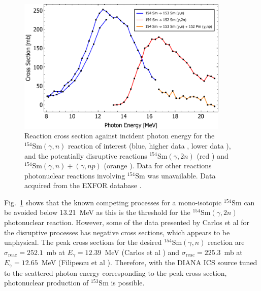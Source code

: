 \documentclass[../main.tex]{subfiles}
\begin{document}
\begin{figure}[!h]
\centering
\includegraphics[width=0.9\textwidth]{Figures/DIANA_Inverse_Compton_Source_Design/Sm154Landscape.pdf}
\caption{Reaction cross section against incident photon energy for the $^{154}\mathrm{Sm} \left(\gamma,n\right)$ reaction of interest (blue, higher data \cite{carlos1974giant}, lower data \cite{filipescu2014photoneutron}), and the potentially disruptive reactions $^{154}\mathrm{Sm} \left(\gamma,2n\right)$ (red \cite{carlos1974giant}) and $^{154}\mathrm{Sm} \left(\gamma,n\right) + \left(\gamma,np\right)$ (orange \cite{carlos1974giant}). Data for other reactions photonuclear reactions involving $^{154}\mathrm{Sm}$ was unavailable. Data acquired from the EXFOR database \cite{zerkin2018experimental}. }
\label{fig:154Sm_cross_section_photon_energy}
\end{figure}
Fig.~\ref{fig:154Sm_cross_section_photon_energy} shows that the known competing processes for a mono-isotopic $^{154}\mathrm{Sm}$ can be avoided below 13.21~\si{\mega\electronvolt} as this is the threshold for the $^{154}\mathrm{Sm}\left(\gamma,2n\right)$ photonuclear reaction. However, some of the data presented by Carlos et al \cite{carlos1974giant} for the disruptive processes has negative cross sections, which appears to be unphysical. The peak cross sections for the desired $^{154}\mathrm{Sm}\left(\gamma,n\right)$ reaction are $\sigma_{\mathrm{reac}} = 252.1$~\si{\milli\barn} at $E_{\gamma} = 12.39$~\si{\mega\electronvolt} (Carlos et al \cite{carlos1974giant}) and $\sigma_{\mathrm{reac}} = 225.3$~\si{\milli\barn} at $E_{\gamma} = 12.65$~\si{\mega\electronvolt} (Filipescu et al \cite{filipescu2014photoneutron}). Therefore, with the DIANA ICS source tuned to the scattered photon energy corresponding to the peak cross section, photonuclear production of $^{153}\mathrm{Sm}$ is possible.
\end{document}
